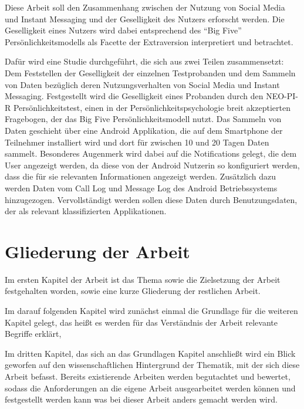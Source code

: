 Diese Arbeit soll den Zusammenhang zwischen der Nutzung von Social Media und Instant Messaging und der Geselligkeit des Nutzers erforscht werden.
Die Geselligkeit eines Nutzers wird dabei entsprechend des "`Big Five"' Persönlichkeitsmodells als Facette der Extraversion interpretiert und betrachtet.

Dafür wird eine Studie durchgeführt, die sich aus zwei Teilen zusammensetzt:
Dem Feststellen der Geselligkeit der einzelnen Testprobanden und dem Sammeln von Daten bezüglich deren Nutzungsverhalten von Social Media und Instant Messaging. 
Festgestellt wird die Geselligkeit eines Probanden durch den NEO-PI-R Persönlichkeitstest, einen in der Persönlichkeitspsychologie breit akzeptierten Fragebogen, der das Big Five Persönlichkeitsmodell nutzt.
Das Sammeln von Daten geschieht über eine Android Applikation, die auf dem Smartphone der Teilnehmer installiert wird und dort für zwischen 10 und 20 Tagen Daten sammelt.
Besonderes Augenmerk wird dabei auf die Notifications gelegt, die dem User angezeigt werden, da diese von der Android Nutzerin so konfiguriert werden, dass die für sie relevanten Informationen angezeigt werden.
Zusätzlich dazu werden Daten vom Call Log und Message Log des Android Betriebssystems hinzugezogen.
Vervollständigt werden sollen diese Daten durch Benutzungsdaten, der als relevant klassifizierten Applikationen.


\section{Gliederung der Arbeit}
\label{ch:Einleitung:sec:Gliederung}

Im ersten Kapitel der Arbeit ist das Thema sowie die Zielsetzung der Arbeit festgehalten worden, sowie eine kurze Gliederung der restlichen Arbeit.
\par

Im darauf folgenden Kapitel wird zunächst einmal die Grundlage für die weiteren Kapitel gelegt, das heißt
es werden für das Verständnis der Arbeit relevante Begriffe erklärt, 
\par


Im dritten Kapitel, das sich an das Grundlagen Kapitel anschließt wird ein Blick geworfen auf den wissenschaftlichen Hintergrund der Thematik,
 mit der sich diese Arbeit befasst.
Bereits existierende Arbeiten werden begutachtet und bewertet, sodass die Anforderungen an die eigene Arbeit ausgearbeitet werden können und festgestellt werden kann was bei dieser Arbeit anders gemacht werden wird.
\par

